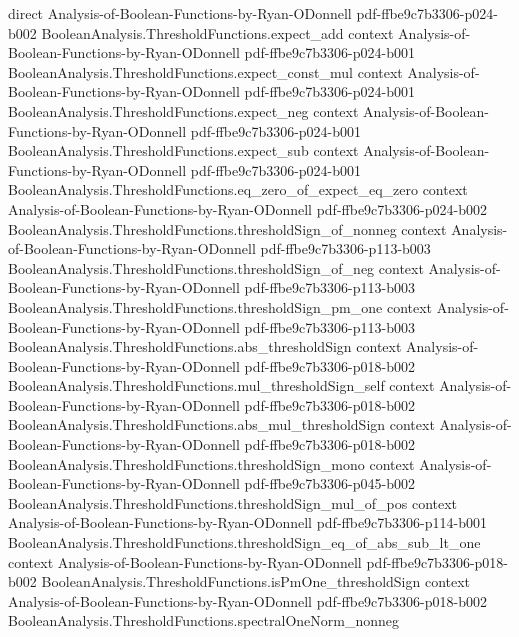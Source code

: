 \begin{theorem}
  {direct}
  {Analysis-of-Boolean-Functions-by-Ryan-ODonnell}
  {pdf-ffbe9c7b3306-p024-b002}
\proofstep
  {BooleanAnalysis.ThresholdFunctions.expect_add}
  {context}
  {Analysis-of-Boolean-Functions-by-Ryan-ODonnell}
  {pdf-ffbe9c7b3306-p024-b001}
\proofstep
  {BooleanAnalysis.ThresholdFunctions.expect_const_mul}
  {context}
  {Analysis-of-Boolean-Functions-by-Ryan-ODonnell}
  {pdf-ffbe9c7b3306-p024-b001}
\proofstep
  {BooleanAnalysis.ThresholdFunctions.expect_neg}
  {context}
  {Analysis-of-Boolean-Functions-by-Ryan-ODonnell}
  {pdf-ffbe9c7b3306-p024-b001}
\proofstep
  {BooleanAnalysis.ThresholdFunctions.expect_sub}
  {context}
  {Analysis-of-Boolean-Functions-by-Ryan-ODonnell}
  {pdf-ffbe9c7b3306-p024-b001}
\proofstep
  {BooleanAnalysis.ThresholdFunctions.eq_zero_of_expect_eq_zero}
  {context}
  {Analysis-of-Boolean-Functions-by-Ryan-ODonnell}
  {pdf-ffbe9c7b3306-p024-b002}
\proofstep
  {BooleanAnalysis.ThresholdFunctions.thresholdSign_of_nonneg}
  {context}
  {Analysis-of-Boolean-Functions-by-Ryan-ODonnell}
  {pdf-ffbe9c7b3306-p113-b003}
\proofstep
  {BooleanAnalysis.ThresholdFunctions.thresholdSign_of_neg}
  {context}
  {Analysis-of-Boolean-Functions-by-Ryan-ODonnell}
  {pdf-ffbe9c7b3306-p113-b003}
\proofstep
  {BooleanAnalysis.ThresholdFunctions.thresholdSign_pm_one}
  {context}
  {Analysis-of-Boolean-Functions-by-Ryan-ODonnell}
  {pdf-ffbe9c7b3306-p113-b003}
\proofstep
  {BooleanAnalysis.ThresholdFunctions.abs_thresholdSign}
  {context}
  {Analysis-of-Boolean-Functions-by-Ryan-ODonnell}
  {pdf-ffbe9c7b3306-p018-b002}
\proofstep
  {BooleanAnalysis.ThresholdFunctions.mul_thresholdSign_self}
  {context}
  {Analysis-of-Boolean-Functions-by-Ryan-ODonnell}
  {pdf-ffbe9c7b3306-p018-b002}
\proofstep
  {BooleanAnalysis.ThresholdFunctions.abs_mul_thresholdSign}
  {context}
  {Analysis-of-Boolean-Functions-by-Ryan-ODonnell}
  {pdf-ffbe9c7b3306-p018-b002}
\proofstep
  {BooleanAnalysis.ThresholdFunctions.thresholdSign_mono}
  {context}
  {Analysis-of-Boolean-Functions-by-Ryan-ODonnell}
  {pdf-ffbe9c7b3306-p045-b002}
\proofstep
  {BooleanAnalysis.ThresholdFunctions.thresholdSign_mul_of_pos}
  {context}
  {Analysis-of-Boolean-Functions-by-Ryan-ODonnell}
  {pdf-ffbe9c7b3306-p114-b001}
\proofstep
  {BooleanAnalysis.ThresholdFunctions.thresholdSign_eq_of_abs_sub_lt_one}
  {context}
  {Analysis-of-Boolean-Functions-by-Ryan-ODonnell}
  {pdf-ffbe9c7b3306-p018-b002}
\proofstep
  {BooleanAnalysis.ThresholdFunctions.isPmOne_thresholdSign}
  {context}
  {Analysis-of-Boolean-Functions-by-Ryan-ODonnell}
  {pdf-ffbe9c7b3306-p018-b002}
\proofstep
  {BooleanAnalysis.ThresholdFunctions.spectralOneNorm_nonneg}

\end{theorem}
